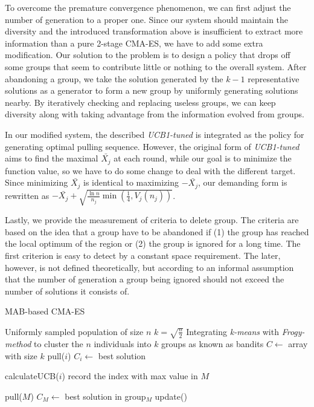 To overcome the premature convergence phenomenon, we can first adjust
the number of generation to a proper one. 
Since our system should maintain the diversity and the
introduced transformation above is insufficient to extract more
information than a pure 2-stage CMA-ES, we have to add some extra
modification.
Our solution to the problem is to design a policy that drops off some
groups that seem to contribute little or nothing to the overall system.
After abandoning a group, we take the solution generated by the $k-1$
representative solutions as a generator to form a new group by uniformly
generating solutions nearby.
By iteratively checking and replacing useless groups, we can keep
diversity along with taking advantage from the information evolved from
groups. 

In our modified system, the described \emph{UCB1-tuned} is integrated as
the policy for generating optimal pulling sequence.
However, the original form of \emph{UCB1-tuned} aims to find the maximal
$\bar{X_j}$ at each round, while our goal is to minimize the function
value, so we have to do some change to deal with the different target.
Since minimizing $\bar{X_j}$ is identical to maximizing $-\bar{X_j}$,
our demanding form is rewritten as $ -\bar{X_j}
+\sqrt{\frac{\ln{n}}{n_j} \min(\frac{1}{4},V_j(n_j))}$.		

Lastly, we provide the measurement of criteria to delete group.
The criteria are based on the idea that a group have to be abandoned if
(1) the group has reached the local optimum of the region or (2) the group
is ignored for a long time.
The first criterion is easy to detect by a constant space requirement.
The later, however, is not defined theoretically, but according to an
informal assumption that the number of generation a group being ignored
should not exceed the number of solutions it consists of.




\begin{algorithm}[H] \caption{MAB-based CMA-ES} 
	 Uniformly sampled population of
	size $n$\; $k = \sqrt{\frac{n}{2}}$\; Integrating \emph{k-means}
	with \emph{Frogy-method} to cluster the $n$ individuals into $k$
	groups as known as bandits\; $C\leftarrow$ array with size $k$\;
	            { pull($i$)\; $C_i\leftarrow$ best
	solution\; }  {  {
			calculateUCB($i$) 
      record the index with max value in $M$\;

		} pull($M$)\;				$C_M \leftarrow$ best solution in
	group$_M$\; update()\; }
\end{algorithm}	

